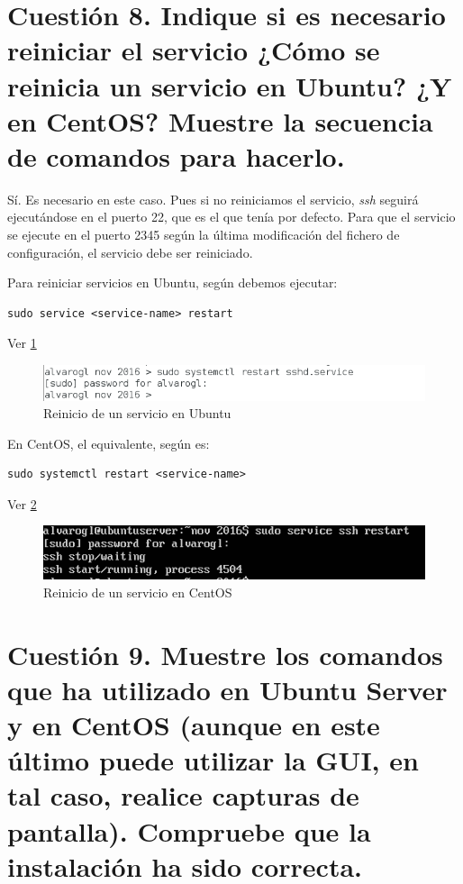 \section{Cuestión 8. Indique si es necesario reiniciar el servicio ¿Cómo se reinicia un servicio en Ubuntu? ¿Y en CentOS? Muestre la secuencia de comandos para hacerlo.}

Sí. Es necesario en este caso. Pues si no reiniciamos el servicio, \textit{ssh} seguirá ejecutándose en el puerto 22, que es el que tenía por defecto. Para que el servicio se ejecute en el puerto 2345 según la última modificación del fichero de configuración, el servicio debe ser reiniciado.

Para reiniciar servicios en Ubuntu, según \cite{services} debemos ejecutar:

\begin{verbatim}
sudo service <service-name> restart
\end{verbatim}

Ver \ref{ise13}

\begin{figure}[H]
	\centering
	\includegraphics[scale=0.6]{ise13.png}
	\caption{Reinicio de un servicio en Ubuntu} \label{ise13}
\end{figure}

En CentOS, el equivalente, según \cite{systemd} es:

\begin{verbatim}
sudo systemctl restart <service-name>
\end{verbatim}

Ver \ref{ise14}

\begin{figure}[H]
	\centering
	\includegraphics[scale=0.6]{ise14.png}
	\caption{Reinicio de un servicio en CentOS} \label{ise14}
\end{figure}

\section{Cuestión 9. Muestre los comandos que ha utilizado en Ubuntu Server y en CentOS (aunque en este último puede utilizar la GUI, en tal caso, realice capturas de pantalla). Compruebe que la instalación ha sido correcta.}

